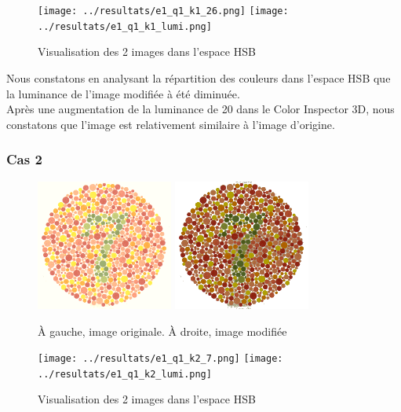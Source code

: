 \documentclass[a4paper]{article}
\begin{document}
\begin{figure}[H]
\begin{center}
\texttt{[image: ../resultats/e1\_q1\_k1\_26.png]}
\texttt{[image: ../resultats/e1\_q1\_k1\_lumi.png]}
\end{center}
\caption{Visualisation des 2 images dans l'espace HSB}
\end{figure}

Nous constatons en analysant la répartition des couleurs dans l'espace HSB que la luminance de l'image modifiée à été diminuée.\\
Après une augmentation de la luminance de 20 dans le Color Inspector 3D, nous constatons que l'image est relativement similaire à l'image d'origine.

\subsubsection{Cas 2}

\begin{figure}[H]
\begin{center}
\includegraphics[width=170px]{../base/cas_2_dalton7.png}
\includegraphics[width=170px]{../base/cas_2_luminance.png}
\end{center}
\caption{À gauche, image originale. À droite, image modifiée}
\end{figure}

\begin{figure}[H]
\begin{center}
\texttt{[image: ../resultats/e1\_q1\_k2\_7.png]}
\texttt{[image: ../resultats/e1\_q1\_k2\_lumi.png]}
\end{center}
\caption{Visualisation des 2 images dans l'espace HSB}
\end{figure}
\end{document}
